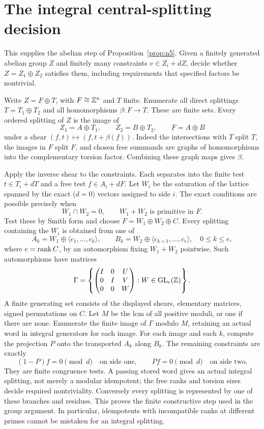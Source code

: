 \section{The integral central-splitting decision}\label{app:central}

This supplies the abelian step of Proposition~\ref{prop:n5}. Given a
finitely generated abelian group $Z$ and finitely many constraints
$v\in Z_i+dZ$, decide whether $Z=Z_1\oplus Z_2$ satisfies them,
including requirements that specified factors be nontrivial.

Write $Z=F\oplus T$, with $F\cong\mathbb Z^n$ and $T$ finite. Enumerate
all direct splittings $T=T_1\oplus T_2$ and all homomorphisms
$\beta:F\to T$. These are finite sets. Every ordered splitting of
$Z$ is the image of
\[
 Z_1=A\oplus T_1,\qquad Z_2=B\oplus T_2,\qquad F=A\oplus B
\]
under a shear $(f,t)\mapsto(f,t+\beta(f))$. Indeed the intersections
with $T$ split $T$, the images in $F$ split $F$, and chosen free
summands are graphs of homomorphisms into the complementary torsion
factor. Combining these graph maps gives $\beta$.

Apply the inverse shear to the constraints. Each separates into the
finite test $t\in T_i+dT$ and a free test $f\in A_i+dF$.
Let $W_i$ be the saturation of the lattice spanned by the exact
($d=0$) vectors assigned to side $i$. The exact conditions are possible
precisely when
\[
 W_1\cap W_2=0,\qquad W_1+W_2\text{ is primitive in }F.
\]
Test these by Smith form and choose $F=W_1\oplus W_2\oplus C$.
Every splitting containing the $W_i$ is obtained from one of
\[
 A_k=W_1\oplus\langle c_1,\ldots,c_k\rangle,\qquad
 B_k=W_2\oplus\langle c_{k+1},\ldots,c_e\rangle,\quad0\le k\le e,
\]
where $e=\operatorname{rank} C$, by an automorphism fixing $W_1+W_2$ pointwise.
Such automorphisms have matrices
\[
 \Gamma=\left\{
 \begin{pmatrix}I&0&U\\0&I&V\\0&0&W\end{pmatrix}:
 W\in\operatorname{GL}_e(\mathbb Z)\right\}.
\]
A finite generating set consists of the displayed shears, elementary
matrices, signed permutations on $C$. Let $M$ be the lcm of all
positive moduli, or one if there are none. Enumerate the finite
image of $\Gamma$ modulo $M$, retaining an actual word in integral
generators for each image. For each image and each $k$, compute the
projection $P$ onto the transported $A_k$ along $B_k$. The remaining
constraints are exactly
\[
 (1-P)f=0\pmod d\quad\text{on side one},\qquad
 Pf=0\pmod d\quad\text{on side two}.
\]
They are finite congruence tests. A passing stored word gives an actual
integral splitting, not merely a modular idempotent; the free ranks and
torsion sizes decide required nontriviality. Conversely every splitting
is represented by one of these branches and residues. This proves the
finite constructive step used in the group argument. In particular,
idempotents with incompatible ranks at different primes cannot be
mistaken for an integral splitting.

